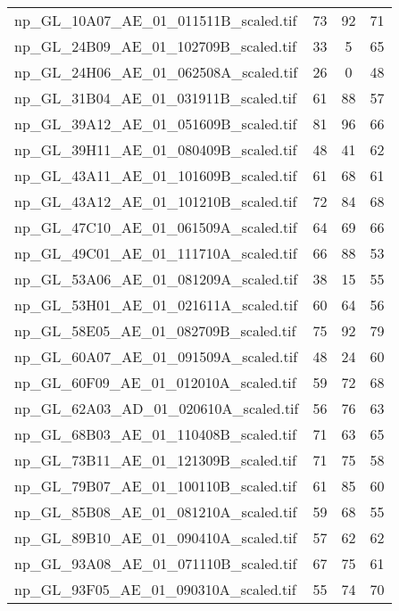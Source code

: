 \begin{tabular}{lccc}
 np\_GL\_10A07\_AE\_01\_011511B\_scaled.tif     & 73    & 92    & 71    \\
 np\_GL\_24B09\_AE\_01\_102709B\_scaled.tif     & 33    & 5     & 65    \\
 np\_GL\_24H06\_AE\_01\_062508A\_scaled.tif     & 26    & 0     & 48    \\
 np\_GL\_31B04\_AE\_01\_031911B\_scaled.tif     & 61    & 88    & 57    \\
 np\_GL\_39A12\_AE\_01\_051609B\_scaled.tif     & 81    & 96    & 66    \\
 np\_GL\_39H11\_AE\_01\_080409B\_scaled.tif     & 48    & 41    & 62    \\
 np\_GL\_43A11\_AE\_01\_101609B\_scaled.tif     & 61    & 68    & 61    \\
 np\_GL\_43A12\_AE\_01\_101210B\_scaled.tif     & 72    & 84    & 68    \\
 np\_GL\_47C10\_AE\_01\_061509A\_scaled.tif     & 64    & 69    & 66    \\
 np\_GL\_49C01\_AE\_01\_111710A\_scaled.tif     & 66    & 88    & 53    \\
 np\_GL\_53A06\_AE\_01\_081209A\_scaled.tif     & 38    & 15    & 55    \\
 np\_GL\_53H01\_AE\_01\_021611A\_scaled.tif     & 60    & 64    & 56    \\
 np\_GL\_58E05\_AE\_01\_082709B\_scaled.tif     & 75    & 92    & 79    \\
 np\_GL\_60A07\_AE\_01\_091509A\_scaled.tif     & 48    & 24    & 60    \\
 np\_GL\_60F09\_AE\_01\_012010A\_scaled.tif     & 59    & 72    & 68    \\
 np\_GL\_62A03\_AD\_01\_020610A\_scaled.tif     & 56    & 76    & 63    \\
 np\_GL\_68B03\_AE\_01\_110408B\_scaled.tif     & 71    & 63    & 65    \\
 np\_GL\_73B11\_AE\_01\_121309B\_scaled.tif     & 71    & 75    & 58    \\
 np\_GL\_79B07\_AE\_01\_100110B\_scaled.tif     & 61    & 85    & 60    \\
 np\_GL\_85B08\_AE\_01\_081210A\_scaled.tif     & 59    & 68    & 55    \\
 np\_GL\_89B10\_AE\_01\_090410A\_scaled.tif     & 57    & 62    & 62    \\
 np\_GL\_93A08\_AE\_01\_071110B\_scaled.tif     & 67    & 75    & 61    \\
 np\_GL\_93F05\_AE\_01\_090310A\_scaled.tif     & 55    & 74    & 70    \\

\end{tabular}
